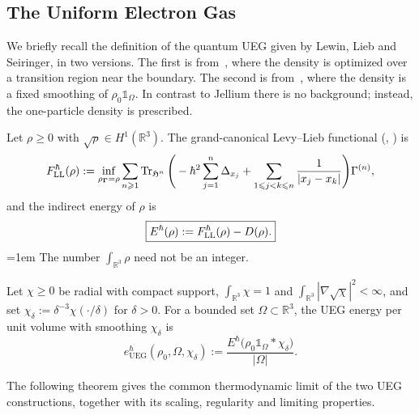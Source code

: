 \documentclass[final,reqno]{amsart}
\theoremstyle{remark}
\theoremstyle{definition}
\renewcommand{\le}{\leqslant}
\renewcommand{\ge}{\geqslant}
\newcommand{\RR}{\mathbb{R}}
\newcommand{\iden}{\mathbb{1}}
\newcommand{\UEG}{\mathrm{UEG}}
\newcommand{\Hil}{\mathfrak{H}}
\newcommand{\vGamma}{{\bm{\Gamma}}}
\begin{document}
\subsection{The Uniform Electron Gas}\label{sec:UEG}

We briefly recall the definition of the quantum UEG given by Lewin, Lieb and Seiringer, in two versions. The first is from~\cite[Sec.~5]{lewin2018statistical}, where the density is optimized over a transition region near the boundary. The second is from~\cite[Sec.~2]{lewin2020local}, where the density is a fixed smoothing of $\rho_0\iden_\Omega$. In contrast to Jellium there is no background; instead, the one-particle density is prescribed.

Let $\rho\ge0$ with $\sqrt\rho\in H^1(\RR^3)$. The grand-canonical Levy--Lieb functional (\cite[Eq.~(5.1)]{lewin2018statistical}, \cite[Sec.~2.1]{lewin2020local}) is
\[
F^\hbar_{\rm LL}(\rho):=\inf_{\rho_{\vGamma}=\rho}\sum_{n\ge1}\Tr_{\Hil^n}\Bigg(-\hbar^2\sum_{j=1}^n \Delta_{x_j}+\sum_{1\le j<k\le n}\frac{1}{|x_j-x_k|}\Bigg)\Gamma^{(n)},
\]
and the indirect energy of $\rho$ is
\begin{equation}\label{eq:UEG_E}
\boxed{E^\hbar(\rho):=F^\hbar_{\rm LL}(\rho)-D(\rho).}
\end{equation}
\begingroup\emergencystretch=1em
The number $\int_{\RR^3}\rho$ need not be an integer.
\par\endgroup

Let $\chi\ge0$ be radial with compact support, $\int_{\RR^3}\chi=1$ and $\int_{\RR^3}|\nabla\sqrt\chi|^2<\infty$, and set $\chi_\delta:=\delta^{-3}\chi(\cdot/\delta)$ for $\delta>0$. For a bounded set $\Omega\subset\RR^3$, the UEG energy per unit volume with smoothing $\chi_\delta$ is
\[
e^\hbar_\UEG(\rho_0,\Omega,\chi_\delta):=\frac{E^\hbar\big(\rho_0\iden_\Omega\ast\chi_\delta\big)}{|\Omega|}.
\]

The following theorem gives the common thermodynamic limit of the two UEG constructions, together with its scaling, regularity and limiting properties.
\end{document}
